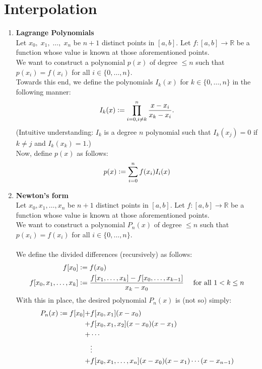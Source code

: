 \documentclass[12pt]{article}
\theoremstyle{definition}
\begin{document}
\section{Interpolation}\label{sec:inter}
\begin{enumerate}
	\itemsep1em 
	\item \textbf{Lagrange Polynomials}\\
	Let $x_0,\;x_1,\;\ldots,\;x_{n}$ be $n+1$ distinct points in $[a, b].$ Let $f:[a, b] \to \mathbb{R}$ be a function whose value is known at those aforementioned points. \\
	We want to construct a polynomial $p(x)$ of degree $\le n$ such that $p(x_i) = f(x_i)$ for all $i \in \{0, \ldots, n\}.$\\
	Towards this end, we define the polynomials $I_k(x)$ for $k \in \{0, \ldots, n\}$ in the following manner:
	\[I_k(x) \vcentcolon= \prod_{i = 0, i \neq k}^{n}\frac{x - x_i}{x_k - x_i}.\]
	(Intuitive understanding: $I_k$ is a degree $n$ polynomial such that $I_k(x_j) = 0$ if $k \neq j$ and $I_k(x_k) = 1.$)\\
	Now, define $p(x)$ as follows:
	\[p(x) \vcentcolon= \sum_{i=0}^{n}f(x_i)I_i(x)\]
	\item \textbf{Newton's form}\\
	Let $x_0, x_1, \ldots, x_n$ be $n+1$ distinct points in $[a, b].$ Let $f:[a, b] \to \mathbb{R}$ be a function whose value is known at those aforementioned points. \\
	We want to construct a polynomial $P_n(x)$ of degree $\le n$ such that $p(x_i) = f(x_i)$ for all $i \in \{0, \ldots, n\}.$\\~\\
	We define the divided differences (recursively) as follows:
	\begin{align*} 
		f[x_0] &\vcentcolon= f(x_0)\\
		f[x_0, x_1, \ldots, x_k] &\vcentcolon= \dfrac{f[x_1, \ldots, x_k] - f[x_0, \ldots, x_{k-1}]}{x_k - x_0} & \text{ for all } 1 < k \le n
	\end{align*}
	With this in place, the desired polynomial $P_n(x)$ is (not so) simply:
	\begin{align*} 
		P_n(x) \vcentcolon= f[x_0]  +& f[x_0, x_1](x - x_0)\\
						 +& f[x_0, x_1, x_2](x - x_0)(x - x_1)\\
						 +& \cdots\\
						  &\vdots\\
						 +& f[x_0, x_1, \ldots, x_n](x - x_0)(x - x_1)\cdots(x - x_{n-1})

\end{align*}
\end{enumerate}
\end{document}
